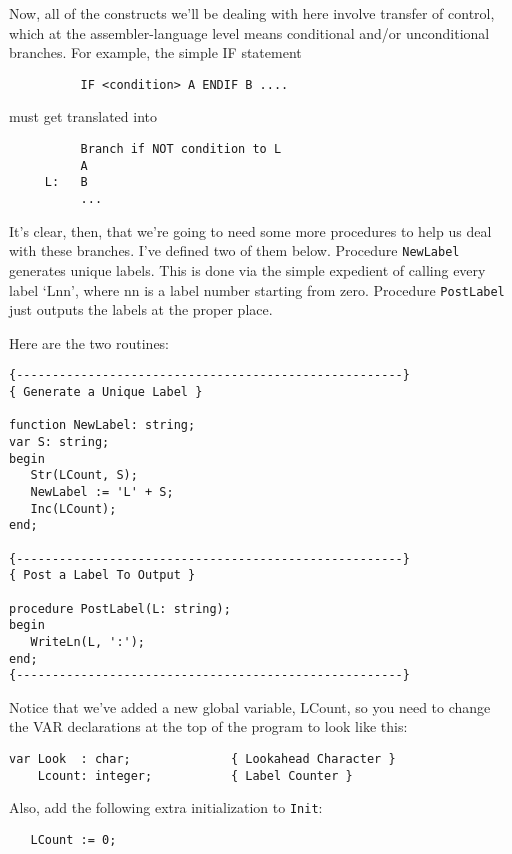 Now, all of the  constructs  we'll  be  dealing with here involve transfer of control, which at the assembler-language  level means conditional  and/or  unconditional branches. For  example, the simple IF statement

\begin{verbatim}
          IF <condition> A ENDIF B ....
\end{verbatim}

must get translated into

\begin{verbatim}
          Branch if NOT condition to L
          A
     L:   B
          ...
\end{verbatim}

It's clear, then, that we're going to need  some  more procedures to  help  us  deal with these branches. I've defined two of them below. Procedure {\tt NewLabel} generates unique labels. This is done via the simple expedient of calling every label  `Lnn', where nn is a label number starting from zero. Procedure {\tt PostLabel} just outputs the labels at the proper place.

Here are the two routines:

\begin{verbatim}
{------------------------------------------------------}
{ Generate a Unique Label }

function NewLabel: string;
var S: string;
begin
   Str(LCount, S);
   NewLabel := 'L' + S;
   Inc(LCount);
end;

{------------------------------------------------------}
{ Post a Label To Output }

procedure PostLabel(L: string);
begin
   WriteLn(L, ':');
end;
{------------------------------------------------------}
\end{verbatim}

Notice that we've added  a  new  global  variable, LCount, so you need to change the VAR declarations at the top of the  program to look like this:

\begin{verbatim}
var Look  : char;              { Lookahead Character }
    Lcount: integer;           { Label Counter }
\end{verbatim}

Also, add the following extra initialization to {\tt Init}:

\begin{verbatim}
   LCount := 0;
\end{verbatim}

